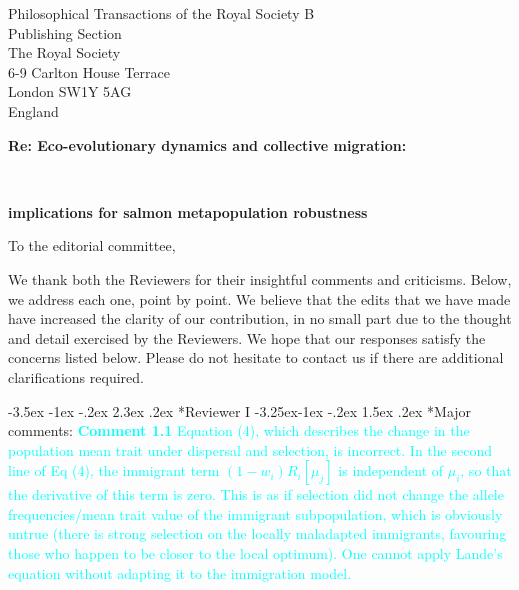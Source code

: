 \documentclass[ucm,12pt]{ucletter}
\makeatletter
\newcounter{section}
\newcounter{subsection}[section]
\renewcommand\section{\@startsection {section}{1}{\z@}%
                                   {-3.5ex \@plus -1ex \@minus -.2ex}%
                                   {2.3ex \@plus.2ex}%
                                   {\normalfont\Large\bfseries}}
\newcommand\subsection{\@startsection{subsection}{2}{\z@}%
                                     {-3.25ex\@plus -1ex \@minus -.2ex}%
                                     {1.5ex \@plus .2ex}%
                                     {\normalfont\large\bfseries}}
\makeatother
\begin{document}
\begin{letter}{
    Philosophical Transactions of the Royal Society B\\
    Publishing Section\\
    The Royal Society\\
    6-9 Carlton House Terrace\\
    London SW1Y 5AG\\
    England\\
    \centerline{\bf{Re: Eco-evolutionary dynamics and collective migration:}}\\
     \centerline{\bf{implications for salmon metapopulation robustness}}
}


\opening{To the editorial committee,}

We thank both the Reviewers for their insightful comments and criticisms. Below, we address each one, point by point. We believe that the edits that we have made have increased the clarity of our contribution, in no small part due to the thought and detail exercised by the Reviewers. We hope that our responses satisfy the concerns listed below. Please do not hesitate to contact us if there are additional clarifications required.


\section*{Reviewer I}
\subsection*{Major comments:}
\noindent \textcolor{cyan}{
{\bf Comment 1.1} Equation (4), which describes the change in the population mean trait under dispersal and selection, is incorrect. In the second line of Eq (4), the immigrant term $(1-w_i) R_i [\mu_j]$ is independent of $\mu_i$, so that the derivative of this term is zero. This is as if selection did not change the allele frequencies/mean trait value of the immigrant subpopulation, which is obviously untrue (there is strong selection on the locally maladapted immigrants, favouring those who happen to be closer to the local optimum). One cannot apply Lande's equation without adapting it to the immigration model.
}


\end{letter}
\end{document}
